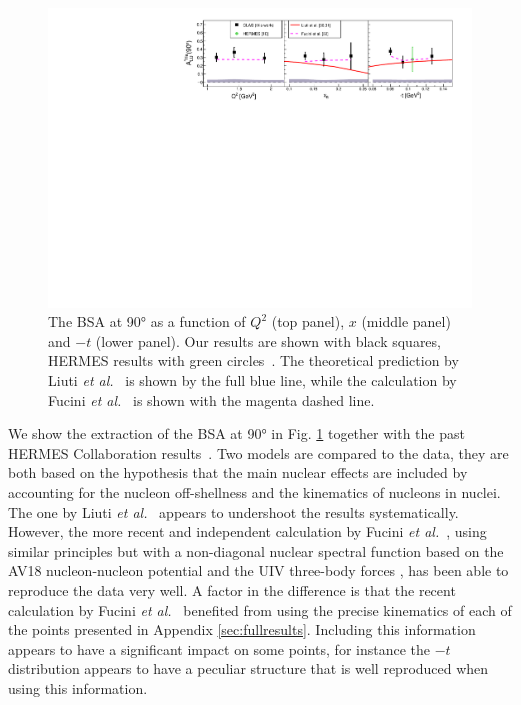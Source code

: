 \documentclass[aps,prc,preprint,superscriptaddress]{revtex4}
\begin{document}
\begin{figure}[tbp]
\center
\includegraphics[width=16cm]{Coherent_ALU_phi_90.pdf}
\caption{The BSA at 90° as a function of $Q^2$ (top panel), $x$ (middle panel) and $-t$ (lower panel).
	Our results are shown with black squares, HERMES results 
	with green circles~\cite{Airapetian:2009cga}. The theoretical prediction 
	by Liuti \textit{et al.}~\cite{Liuti:2005gi,GonzalezHernandez:2012jv} is shown 
	by the full blue line, while the calculation by Fucini 
	\textit{et al.}~\cite{Fucini:2018gso} is shown with the magenta dashed line.}
\label{fig:CohALU90}
\end{figure}

We show the extraction of the BSA at 90° in Fig. \ref{fig:CohALU90} together with the 
past HERMES Collaboration results~\cite{Airapetian:2009cga}. Two models are compared to the 
data, they are both based on the hypothesis that the main nuclear effects are 
included by accounting for the nucleon off-shellness and the kinematics of nucleons in nuclei. The 
one by Liuti \textit{et al.}~\cite{Liuti:2005gi,GonzalezHernandez:2012jv} 
appears to undershoot the results systematically. However, the more recent and independent 
calculation by Fucini \textit{et al.}~\cite{Fucini:2018gso}, using similar principles but with a non-diagonal nuclear spectral 
function \cite{Viviani:2001wu} based on the AV18 nucleon-nucleon potential \cite{Wiringa:1994wb} 
and the UIV three-body forces \cite{Pudliner:1995wk}, has been able to reproduce the data very 
well. A factor in the difference is that the recent calculation by Fucini {\it et 
al.}~\cite{Fucini:2018gso} benefited from using the precise kinematics of each of the points presented 
in Appendix \ref{sec:fullresults}. Including this information appears to have a significant 
impact on some points, for instance the $-t$ distribution appears to have a peculiar structure 
that is well reproduced when using this information. 
\end{document}
